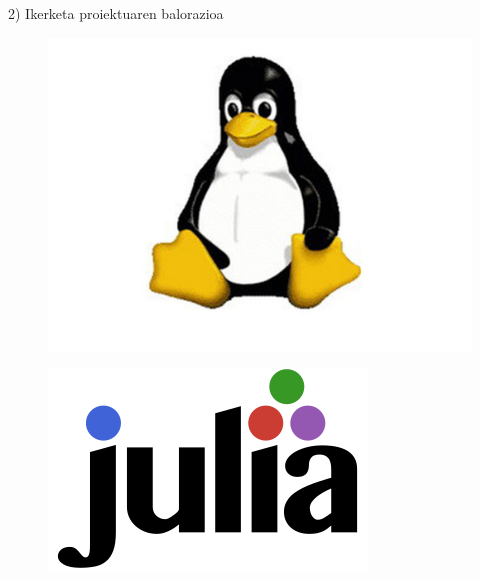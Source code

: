 \documentclass[
 10pt,%
 compress,%
 t,       %
 xcolor=svgnames
]{beamer}
\theoremstyle{definition} \newtheorem{definicion}{Definicion}[section]
\theoremstyle{propiedades} \newtheorem{propiedades}{Propiedades}[section]
\begin{document}
\begin{frame}{2) Ikerketa proiektuaren balorazioa}
\begin{itemize}
\begin{itemize}
\end{itemize}


\begin{figure}
%
%
\begin{minipage}{.4\textwidth}
	\colorbox{white}  {\includegraphics[width=0.8\linewidth]{SoftwareLibre}}
\end{minipage}
%
\begin{minipage}{.4\textwidth}
\colorbox{white}  {\includegraphics[width=0.5\linewidth]{julia-logo-color}}
\end{minipage}
%

%
\end{figure}


\end{itemize}


\end{frame}
\end{document}
